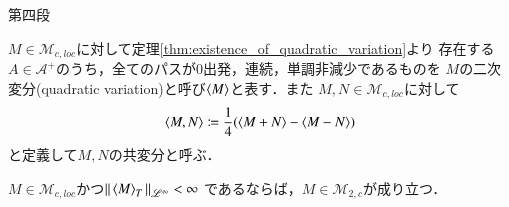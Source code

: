 \begin{prf}
\begin{description}
			\item[第四段]
		\end{description}
	\end{prf}
	
	\begin{screen}
		\begin{dfn}[二次変分]
			$M \in \mathcal{M}_{c,loc}$に対して定理\ref{thm:existence_of_quadratic_variation}より
			存在する$A \in \mathcal{A}^+$のうち，全てのパスが$0$出発，連続，単調非減少であるものを
			$M$の二次変分(quadratic variation)と呼び$\inprod<M>$と表す．また
			$M,N \in \mathcal{M}_{c,loc}$に対して
			\begin{align}
				\inprod<M,N> \coloneqq \frac{1}{4} (\inprod<M+N> - \inprod<M-N>)
			\end{align}
			と定義して$M,N$の共変分と呼ぶ．
		\end{dfn}
	\end{screen}

	\begin{screen}
		\begin{thm}[二次変分が有界な連続局所マルチンゲールは連続な二乗可積分マルチンゲール]
			$M \in \mathcal{M}_{c,loc}$かつ$\Norm{\inprod<M>_T}{\mathscr{L}^{\infty}} < \infty$
			であるならば，$M \in \mathcal{M}_{2,c}$が成り立つ．
			\label{thm:quadratic_variation_bounded_then_M_2c}
		\end{thm}
	\end{screen}
	
